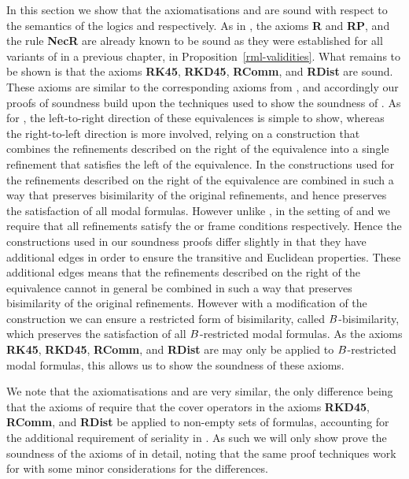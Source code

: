 In this section we show that the axiomatisations \axiomRmlKFF{} and \axiomRmlKD{} are sound with respect to the semantics of the logics \logicRmlKFF{} and \logicRmlKD{} respectively.
As in \logicRmlK{}, the axioms {\bf R} and {\bf RP}, and the rule {\bf NecR} are already known to be sound as they were established for all variants of \logicRml{} in a previous chapter, in Proposition~\ref{rml-validities}.
What remains to be shown is that the axioms {\bf RK45}, {\bf RKD45}, {\bf RComm}, and {\bf RDist} are sound.
These axioms are similar to the corresponding axioms from \axiomRmlK{}, and accordingly our proofs of soundness build upon the techniques used to show the soundness of \axiomRmlK{}.
As for \axiomRmlK{}, the left-to-right direction of these equivalences is simple to show, whereas the right-to-left direction is more involved, relying on a construction that combines the refinements described on the right of the equivalence into a single refinement that satisfies the left of the equivalence.
In the constructions used for \axiomRmlK{} the refinements described on the right of the equivalence are combined in such a way that preserves bisimilarity of the original refinements, and hence preserves the satisfaction of all modal formulas.
However unlike \logicRmlK{}, in the setting of \logicRmlKFF{} and \logicRmlKD{} we require that all refinements satisfy the \classKFF{} or \classKD{} frame conditions respectively.
Hence the constructions used in our soundness proofs differ slightly in that they have additional edges in order to ensure the transitive and Euclidean properties.
These additional edges means that the refinements described on the right of the equivalence cannot in general be combined in such a way that preserves bisimilarity of the original refinements.
However with a modification of the construction we can ensure a restricted form of bisimilarity, called $B$-bisimilarity, which preserves the satisfaction of all $B$-restricted modal formulas.
As the axioms {\bf RK45}, {\bf RKD45}, {\bf RComm}, and {\bf RDist} are may only be applied to $B$-restricted modal formulas, this allows us to show the soundness of these axioms.

We note that the axiomatisations \axiomRmlKFF{} and \axiomRmlKD{} are very similar, the only difference being that the axioms of \axiomRmlKD{} require that the cover operators in the axioms {\bf RKD45}, {\bf RComm}, and {\bf RDist} be applied to non-empty sets of formulas, accounting for the additional requirement of seriality in \classKD{}.
As such we will only show prove the soundness of the axioms of \axiomRmlKFF{} in detail, noting that the same proof techniques work for \axiomRmlKD{} with some minor considerations for the differences.

